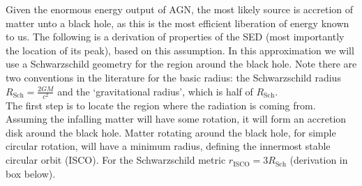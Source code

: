 \documentclass[11pt]{article}
\begin{document}
\noindent
Given the enormous energy output of AGN, the most likely source is accretion of matter unto a black hole, as this is the most efficient liberation of energy known to us. The following is a derivation of properties of the SED (most importantly the location of its peak), based on this assumption. In this approximation we will use a Schwarzschild geometry for the region around the black hole. Note there are two conventions in the literature for the basic radius: the Schwarzschild radius $ R_{\mathrm{Sch}} = \frac{2GM}{c^2}$ and the `gravitational radius', which is half of $R_{\mathrm{Sch}}$.\\
\indent The first step is to locate the region where the radiation is coming from. Assuming the infalling matter will have some rotation, it will form an accretion disk around the black hole. Matter rotating around the black hole, for simple circular rotation, will have a minimum radius, defining the innermost stable circular orbit (ISCO). For the Schwarzschild metric $r_{\mathrm{ISCO}} = 3R_{\mathrm{Sch}}$ (derivation in box below).
\end{document}
